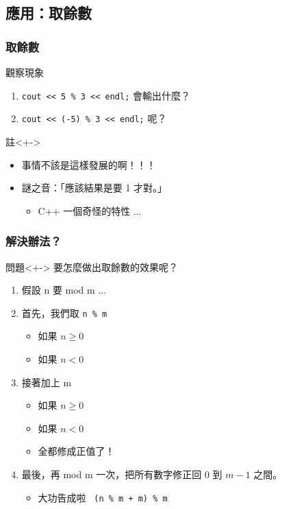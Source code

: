\documentclass[utf8]{beamer}
\begin{document}
\begin{CJK}{UTF8}{bkai}
\subsection{應用：取餘數}

\begin{frame}[fragile]
  \frametitle{取餘數}
  \begin{block}{觀察現象}
    \begin{enumerate}[<+->]
    \item \lstinline{cout << 5 % 3 << endl;} 會輸出什麼？
    \item \lstinline{cout << (-5) % 3 << endl;} 呢？
    \end{enumerate}
  \end{block}
  \begin{exampleblock}{註}<+->
    \begin{itemize}
    \item 事情不該是這樣發展的啊！！！
    \item<+-> 謎之音：「應該結果是要 1 才對。」
      \begin{itemize}[<+->]
      \item C++ 一個\alert{奇怪的特性} ...
      \end{itemize}
    \end{itemize}
  \end{exampleblock}
\end{frame}

\begin{frame}[fragile]
  \frametitle{解決辦法？}
  \begin{block}{問題}<+->
  要怎麼做出取餘數的效果呢？
  \end{block}
  \begin{enumerate}[<+->]
  \item 假設 n 要 mod m ...
  \item 首先，我們取 \lstinline{n % m}
    \begin{itemize}[<+->]
    \item 如果 $n\geq{0}$
    \item 如果 $n<0$
    \end{itemize}
  \item 接著加上 m
    \begin{itemize}[<+->]
    \item 如果 $n\geq{0}$
    \item 如果 $n<0$
    \item 全都修成正值了！
    \end{itemize}
  \item 最後，再 mod m 一次，把所有數字修正回 $0$ 到 $m-1$ 之間。
    \begin{itemize}[<+->]
    \item 大功告成啦~ \lstinline{(n % m + m) % m}
    \end{itemize}
  \end{enumerate}
\end{frame}


\end{CJK}
\end{document}
